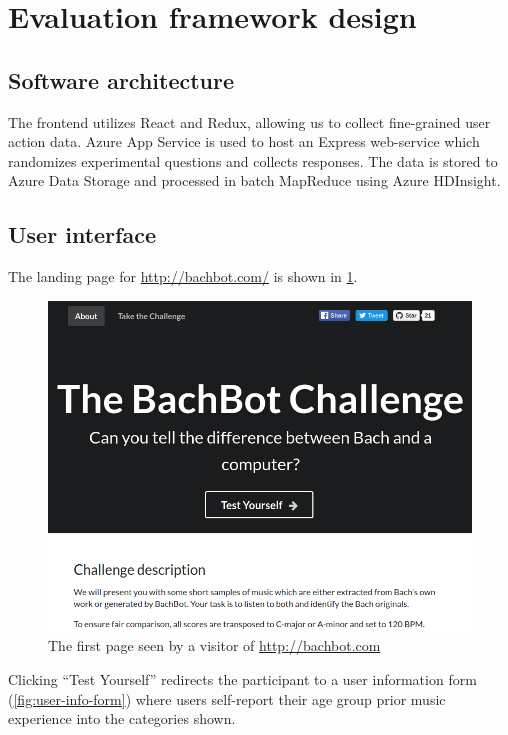\section{Evaluation framework design}

\subsection{Software architecture}

The frontend utilizes React and Redux, allowing us to collect fine-grained user
action data. Azure App Service is used to host an Express web-service which
randomizes experimental questions and collects responses. The data is stored to
Azure Data Storage and processed in batch MapReduce using Azure HDInsight.

\subsection{User interface}


The landing page for \url{http://bachbot.com/} is shown in \cref{fig:bachbot-front-page}.

\begin{figure}[tb]
  \centering
  \includegraphics[width=1.0\linewidth]{bachbot-front-page.png}
  \caption{The first page seen by a visitor of \url{http://bachbot.com}}
  \label{fig:bachbot-front-page}
\end{figure}

Clicking ``Test Yourself'' redirects the participant to a user information form
(\cref{fig:user-info-form}) where users self-report their age
group prior music experience into the categories shown.

